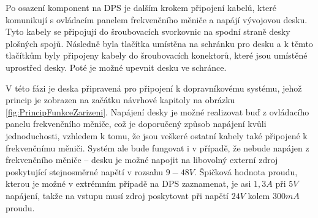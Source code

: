 Po osazení komponent na DPS je dalším krokem připojení kabelů, které komunikují s ovládacím panelem frekvenčního měniče a napájí vývojovou desku. Tyto kabely se připojují do šroubovacích svorkovnic na spodní straně desky plošných spojů. Následně byla tlačítka umístěna na schránku pro desku a k těmto tlačítkům byly připojeny kabely do šroubovacích konektorů, které jsou umístěné uprostřed desky. Poté je možné upevnit desku ve schránce.

V této fázi je deska připravená pro připojení k dopravníkovému systému, jehož princip je zobrazen na začátku návrhové kapitoly na obrázku \ref{fig:PrincipFunkceZarizeni}. Napájení desky je možné realizovat buď z ovládacího panelu frekvenčního měniče, což je doporučený způsob napájení kvůli jednoduchosti, vzhledem k tomu, že jsou veškeré ostatní kabely také připojené k frekvenčnímu měniči. Systém ale bude fungovat i v případě, že nebude napájen z frekvenčního měniče – desku je možné napojit na libovolný externí zdroj poskytující stejnosměrné napětí v rozsahu $9-48V$. Špičková hodnota proudu, kterou je možné v extrémním případě na DPS zaznamenat, je asi $1,3A$ při $5V$ napájení, takže na vstupu musí zdroj poskytovat při napětí $24V$ kolem $300mA$ proudu.